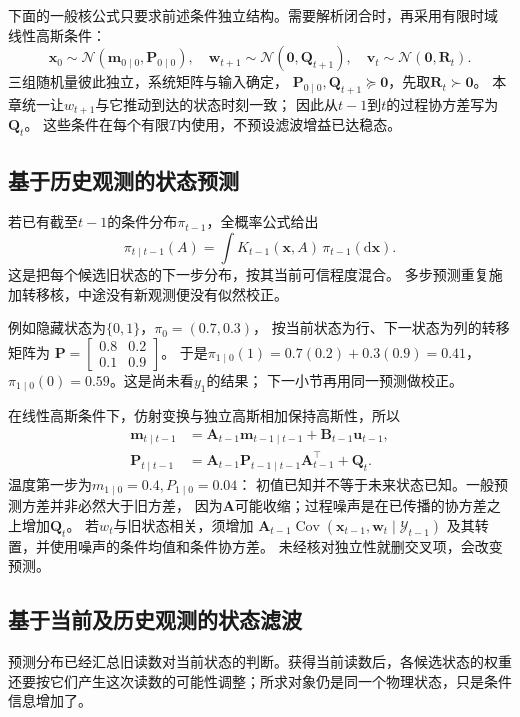 下面的一般核公式只要求前述条件独立结构。需要解析闭合时，再采用有限时域
线性高斯条件：
\[
 \bm x_0\sim\mathcal N(\bm m_{0\mid0},\bm P_{0\mid0}),\quad
 \bm w_{t+1}\sim\mathcal N(\bm0,\bm Q_{t+1}),\quad
 \bm v_t\sim\mathcal N(\bm0,\bm R_t).
\]
三组随机量彼此独立，系统矩阵与输入确定，
$\bm P_{0\mid0},\bm Q_{t+1}\succeq\bm0$，先取$\bm R_t\succ\bm0$。
本章统一让$w_{t+1}$与它推动到达的状态时刻一致；
因此从$t-1$到$t$的过程协方差写为$\bm Q_t$。
这些条件在每个有限$T$内使用，不预设滤波增益已达稳态。

\subsection{基于历史观测的状态预测}
若已有截至$t-1$的条件分布$\pi_{t-1}$，全概率公式给出
\begin{equation}
 \pi_{t\mid t-1}(A)
     =\int K_{t-1}(\bm x,A)\,\pi_{t-1}(\mathrm d\bm x).
 \label{eq:dynamical-general-prediction-kernel}
\end{equation}
这是把每个候选旧状态的下一步分布，按其当前可信程度混合。
多步预测重复施加转移核，中途没有新观测便没有似然校正。

例如隐藏状态为$\{0,1\}$，$\pi_0=(0.7,0.3)$，
按当前状态为行、下一状态为列的转移矩阵为
$\bm P=\left[\begin{smallmatrix}0.8&0.2\\0.1&0.9\end{smallmatrix}\right]$。
于是$\pi_{1\mid0}(1)=0.7(0.2)+0.3(0.9)=0.41$，
$\pi_{1\mid0}(0)=0.59$。这是尚未看$y_1$的结果；
下一小节再用同一预测做校正。

在线性高斯条件下，仿射变换与独立高斯相加保持高斯性，所以
\begin{align}
 \bm m_{t\mid t-1}
   &=\bm A_{t-1}\bm m_{t-1\mid t-1}+\bm B_{t-1}\bm u_{t-1},
       \label{eq:dynamical-kalman-predicted-mean}\\
 \bm P_{t\mid t-1}
   &=\bm A_{t-1}\bm P_{t-1\mid t-1}\bm A_{t-1}^\top+\bm Q_t.
       \label{eq:dynamical-kalman-predicted-covariance}
\end{align}
温度第一步为$m_{1\mid0}=0.4,P_{1\mid0}=0.04$：
初值已知并不等于未来状态已知。一般预测方差并非必然大于旧方差，
因为$\bm A$可能收缩；过程噪声是在已传播的协方差之上增加$\bm Q_t$。
若$w_t$与旧状态相关，须增加
$\bm A_{t-1}\operatorname{Cov}(\bm x_{t-1},\bm w_t\mid\mathcal Y_{t-1})$
及其转置，并使用噪声的条件均值和条件协方差。
未经核对独立性就删交叉项，会改变预测。

\subsection{基于当前及历史观测的状态滤波}
预测分布已经汇总旧读数对当前状态的判断。获得当前读数后，各候选状态的权重还要按它们产生这次读数的可能性调整；所求对象仍是同一个物理状态，只是条件信息增加了。

